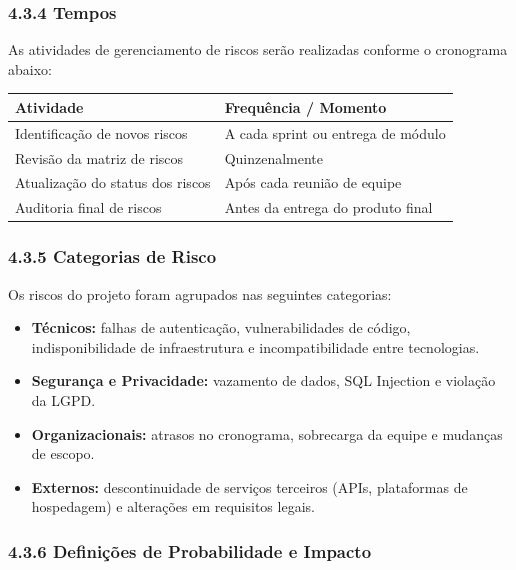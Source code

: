 \documentclass[12pt, a4paper]{article}
\begin{document}
\subsubsection*{4.3.4 Tempos}
 
As atividades de gerenciamento de riscos ser\~ao realizadas conforme o cronograma abaixo:
 
\vspace{6pt}
\noindent
\renewcommand{\arraystretch}{1.4}
\begin{tabular}{|p{6cm}|p{8cm}|}
\hline
\textbf{Atividade} & \textbf{Frequ\^encia / Momento} \\
\hline
Identifica\c{c}\~ao de novos riscos & A cada sprint ou entrega de m\'odulo \\
\hline
Revis\~ao da matriz de riscos & Quinzenalmente \\
\hline
Atualiza\c{c}\~ao do status dos riscos & Ap\'os cada reuni\~ao de equipe \\
\hline
Auditoria final de riscos & Antes da entrega do produto final \\
\hline
\end{tabular}
 
\subsubsection*{4.3.5 Categorias de Risco}
 
Os riscos do projeto foram agrupados nas seguintes categorias:
 
\begin{itemize}[leftmargin=2cm, itemsep=4pt]
  \item \textbf{T\'ecnicos:} falhas de autentica\c{c}\~ao, vulnerabilidades de c\'odigo, indisponibilidade de infraestrutura e incompatibilidade entre tecnologias.
  \item \textbf{Segurança e Privacidade:} vazamento de dados, SQL Injection e viola\c{c}\~ao da LGPD.
  \item \textbf{Organizacionais:} atrasos no cronograma, sobrecarga da equipe e mudan\c{c}as de escopo.
  \item \textbf{Externos:} descontinuidade de servi\c{c}os terceiros (APIs, plataformas de hospedagem) e altera\c{c}\~oes em requisitos legais.
\end{itemize}
 
\subsubsection*{4.3.6 Defini\c{c}\~oes de Probabilidade e Impacto}
 
\end{document}
